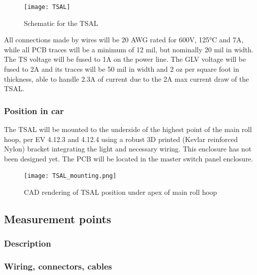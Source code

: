 \documentclass{article}
\begin{document}
\begin{figure}[h]
\centering
\texttt{[image: TSAL]}
\caption{Schematic for the TSAL}
\label{fig:TSALcircuit}
\end{figure}

All connections made by wires will be 20 AWG rated for 600V, 125°C and 7A, while all PCB traces will be a minimum of 12 mil, but nominally 20 mil in width. The TS voltage will be fused to 1A on the power line. The GLV voltage will be fused to 2A and its traces will be 50 mil in width and 2 oz per square foot in thickness, able to handle 2.3A of current due to the 2A max current draw of the TSAL.

\subsubsection{Position in car}
The TSAL will be mounted to the underside of the highest point of the main roll hoop, per EV 4.12.3 and 4.12.4 using a robust 3D printed (Kevlar reinforced Nylon) bracket integrating the light and necessary wiring. This enclosure has not been designed yet. The PCB will be located in the master switch panel enclosure.

\begin{figure}[h]
\centering
\texttt{[image: TSAL\_mounting.png]}
\caption{CAD rendering of TSAL position under apex of main roll hoop}
\end{figure}

\subsection{Measurement points}\label{measurement_points}
\subsubsection{Description}

\subsubsection{Wiring, connectors, cables}
\end{document}
